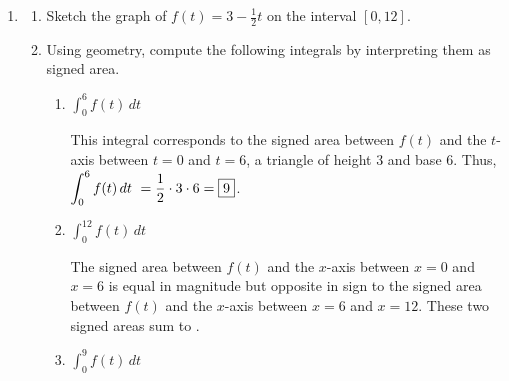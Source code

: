 \documentclass{article}
\begin{document}
\begin{enumerate}
\begin{enumerate}
\begin{solution}
One answer is $\displaystyle \lim_{n \to \infty} \displaystyle \sum_{k=1}^{n} f(x_k) \Delta x$, where $x_k=4+k\Delta x$ and $\Delta x=\frac{3}{n}$.   
\end{solution}
\vfill
\vfill
\vfill
 \end{enumerate}
\newpage
  \item 
  \begin{enumerate}
\item Sketch the graph of $f(t)=3-\frac{1}{2}t$ on the interval $[0,12]$. 

\begin{solution}
    \begin{center}
    \end{center}
\end{solution}
\vfill
\vfill
\vfill
\item Using geometry, compute the following integrals by interpreting them as signed area.
  \begin{enumerate}
      \item $\displaystyle \int_{0}^{6} f(t)\,dt\ $
      
      \begin{solution}
          This integral corresponds to the signed area between $f(t)$ and the $t$-axis between $t=0$ and $t=6$, a triangle of height 3 and base 6. Thus, $\displaystyle \int_{0}^{6} f(t)\,dt\ =\frac{1}{2}\cdot3\cdot6=\fbox{9}$.
      \end{solution}
      \vfill
\item $\displaystyle \int_{0}^{12} f(t)\,dt\ $
      
      \begin{solution}
       The signed area between $f(t)$ and the $x$-axis between $x=0$ and $x=6$ is equal in magnitude but opposite in sign to the signed area between $f(t)$ and the $x$-axis between $x=6$ and $x=12$. These two signed areas sum to .  
      \end{solution}
      \vfill
      \item $\displaystyle \int_{0}^{9} f(t)\,dt\ $
      

\end{enumerate}
\end{enumerate}
\end{enumerate}
\end{document}

